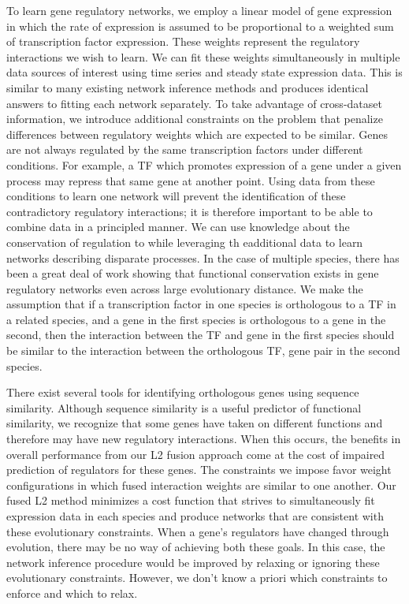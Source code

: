 \documentclass[11pt]{article}
\begin{document}
To learn gene regulatory networks, we employ a linear model of gene expression in which the rate of expression is assumed to be proportional to a weighted sum of transcription factor expression. These weights represent the regulatory interactions we wish to learn. We can fit these weights simultaneously in multiple data sources of interest using time series and steady state expression data. This is similar to many existing network inference methods and produces identical answers to fitting each network separately. To take advantage of cross-dataset information, we introduce additional constraints on the problem that penalize differences between regulatory weights which are expected to be similar. Genes are not always regulated by the same transcription factors under different conditions. For example, a TF which promotes expression of a gene under a given process may repress that same gene at another point. Using data from these conditions to learn one network will prevent the identification of these contradictory regulatory interactions; it is therefore important to be able to combine data in a principled manner. We can use knowledge about the conservation of regulation to while leveraging th eadditional data to learn networks describing disparate processes. In the case of multiple species, there has been a great deal of work showing that functional conservation exists in gene regulatory networks even across large evolutionary distance. We make the assumption that if a transcription factor in one species is orthologous to a TF in a related species, and a gene in the first species is orthologous to a gene in the second, then the interaction between the TF and gene in the first species should be similar to the interaction between the orthologous TF, gene pair in the second species. 

There exist several tools for identifying orthologous genes using sequence similarity. Although sequence similarity is a useful predictor of functional similarity, we recognize that some genes have taken on different functions and therefore may have new regulatory interactions. When this occurs, the benefits in overall performance from our L2 fusion approach come at the cost of impaired prediction of regulators for these genes. The constraints we impose favor weight configurations in which fused interaction weights are similar to one another. Our fused L2 method minimizes a cost function that strives to simultaneously fit expression data in each species and produce networks that are consistent with these evolutionary constraints. When a gene's regulators have changed through evolution, there may be no way of achieving both these goals. In this case, the network inference procedure would be improved by relaxing or ignoring these evolutionary constraints. However, we don't know a priori which constraints to enforce and which to relax.  
\end{document}
